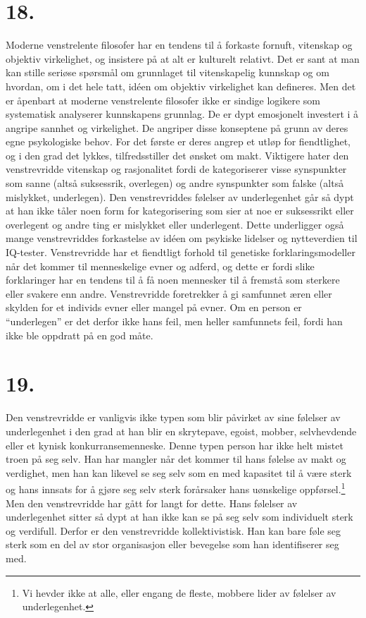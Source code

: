\documentclass[oneside]{book}
\begin{document}
\section*{18.}
Moderne venstrelente filosofer har en tendens til å forkaste fornuft, vitenskap
og objektiv virkelighet, og insistere på at alt er kulturelt relativt. Det er
sant at man kan stille seriøse spørsmål om grunnlaget til vitenskapelig
kunnskap og om hvordan, om i det hele tatt, idéen om objektiv virkelighet kan
defineres. Men det er åpenbart at moderne venstrelente filosofer ikke er
sindige logikere som systematisk analyserer kunnskapens grunnlag. De er dypt
emosjonelt investert i å angripe sannhet og virkelighet. De angriper disse
konseptene på grunn av deres egne psykologiske behov. For det første er deres
angrep et utløp for fiendtlighet, og i den grad det lykkes, tilfredsstiller det
ønsket om makt. Viktigere hater den venstrevridde vitenskap og rasjonalitet
fordi de kategoriserer visse synspunkter som sanne (altså suksessrik,
overlegen) og andre synspunkter som falske (altså mislykket, underlegen). Den
venstrevriddes følelser av underlegenhet går så dypt at han ikke tåler noen
form for kategorisering som sier at noe er suksessrikt eller overlegent og
andre ting er mislykket eller underlegent. Dette underligger også mange
venstrevriddes forkastelse av idéen om psykiske lidelser og nytteverdien til
IQ-tester. Venstrevridde har et fiendtligt forhold til genetiske
forklaringsmodeller når det kommer til menneskelige evner og adferd, og dette
er fordi slike forklaringer har en tendens til å få noen mennesker til å
fremstå som sterkere eller svakere enn andre. Venstrevridde foretrekker å gi
samfunnet æren eller skylden for et individs evner eller mangel på evner.
Om en person er ``underlegen'' er det derfor ikke hans feil, men heller
samfunnets feil, fordi han ikke ble oppdratt på en god måte.

\section*{19.}
Den venstrevridde er vanligvis ikke typen som blir påvirket av sine følelser av
underlegenhet i den grad at han blir en skrytepave, egoist, mobber,
selvhevdende eller et kynisk konkurransemenneske. Denne typen person har ikke
helt mistet troen på seg selv. Han har mangler når det kommer til hans følelse
av makt og verdighet, men han kan likevel se seg selv som en med kapasitet til
å være sterk og hans innsats for å gjøre seg selv sterk forårsaker hans
uønskelige oppførsel.\footnote{Vi hevder ikke at alle, eller engang de fleste,
mobbere lider av følelser av underlegenhet.} Men den venstrevridde har gått for
langt for dette. Hans følelser av underlegenhet sitter så dypt at han ikke kan
se på seg selv som individuelt sterk og verdifull. Derfor er den venstrevridde
kollektivistisk. Han kan bare føle seg sterk som en del av stor organisasjon
eller bevegelse som han identifiserer seg med.
\end{document}
